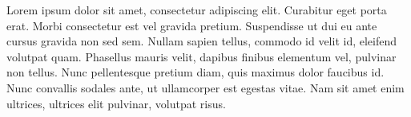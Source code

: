 Lorem ipsum dolor sit amet, consectetur adipiscing elit. Curabitur
eget porta erat. Morbi consectetur est vel gravida
pretium. Suspendisse ut dui eu ante cursus gravida non sed sem. Nullam
sapien tellus, commodo id velit id, eleifend volutpat quam. Phasellus
mauris velit, dapibus finibus elementum vel, pulvinar non tellus. Nunc
pellentesque pretium diam, quis maximus dolor faucibus id. Nunc
convallis sodales ante, ut ullamcorper est egestas vitae. Nam sit amet
enim ultrices, ultrices elit pulvinar, volutpat risus.
